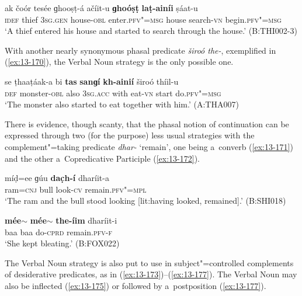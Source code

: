 \begin{exe}
\ex
\label{ex:13-169}
\gll ak čoór tesée ɡhooṣṭ-á ačíit-u \textbf{ɡhoóṣṭ} \textbf{ laṭ-ainíi} ṣáat-u \\
\textsc{idef} thief \textsc{3sg.gen} house-\textsc{obl} enter.\textsc{pfv"=msg} house search-\textsc{vn} begin.\textsc{pfv"=msg} \\
\glt `A thief entered his house and started to search through the house.' (B:THI002-3) 
\end{exe}

With another nearly synonymous phasal predicate \textit{široó the-}, exemplified in (\ref{ex:13-170}), the Verbal Noun strategy is the only possible one.

\begin{exe}
\ex
\label{ex:13-170}
\gll se ṭhaaṭáak-a bi \textbf{tas} \textbf{sanɡí} \textbf{kh-ainií}  široó thíil-u \\
\textsc{def} monster-\textsc{obl} also \textsc{3sg.acc} with eat-\textsc{vn} start do.\textsc{pfv"=msg} \\
\glt `The monster also started to eat together with him.' (A:THA007) 
\end{exe}

There is evidence, though scanty, that the phasal notion of continuation can be expressed through two (for the purpose) less usual strategies with the complement"=taking predicate \textit{dhar-} `remain', one being a~converb (\ref{ex:13-171}) and the other a~Copredicative Participle (\ref{ex:13-172}).

\begin{exe}
\ex
\label{ex:13-171}
\gll míḍ=ee ɡúu \textbf{dac̣h-í} dharíit-a \\
ram=\textsc{cnj} bull look-\textsc{cv} remain.\textsc{pfv"=mpl} \\
\glt `The ram and the bull stood  looking [lit:having looked, remained].' (B:SHI018)

\ex
\label{ex:13-172}
\gll \textbf{mée$\sim$} \textbf{mée$\sim$} \textbf{the-íim} dharíit-i  \\
baa baa do-\textsc{cprd} remain.\textsc{pfv-f} \\
\glt `She kept bleating.' (B:FOX022) 
\end{exe}

 The Verbal Noun strategy is also put to use in
subject"=controlled complements of desiderative predicates, as in
(\ref{ex:13-173})--(\ref{ex:13-177}). The Verbal Noun may also be inflected
(\ref{ex:13-175}) or followed by
a~postposition (\ref{ex:13-177}).


